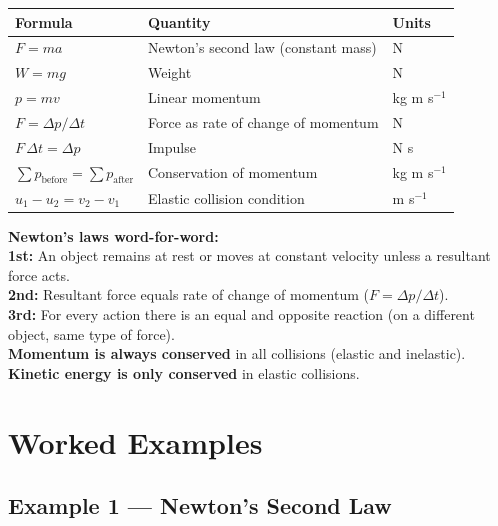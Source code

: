 \begin{minipage}{\linewidth}
\begin{tcolorbox}[colback=lightgold, colframe=accentgold]
\renewcommand{\arraystretch}{1.8}
\begin{tabular}{@{}lll@{}}
\toprule
\textbf{Formula} & \textbf{Quantity} & \textbf{Units} \\
\midrule
$F = ma$ & Newton's second law (constant mass) & N \\
$W = mg$ & Weight & N \\
$p = mv$ & Linear momentum & kg m s$^{-1}$ \\
$F = \Delta p / \Delta t$ & Force as rate of change of momentum & N \\
$F\,\Delta t = \Delta p$ & Impulse & N s \\
$\sum p_{\text{before}} = \sum p_{\text{after}}$ & Conservation of momentum & kg m s$^{-1}$ \\
$u_1 - u_2 = v_2 - v_1$ & Elastic collision condition & m s$^{-1}$ \\
\bottomrule
\end{tabular}
\end{tcolorbox}

\vspace{0.5em}
\begin{tcolorbox}[colback=lightblue, colframe=darkblue]
\textbf{Newton's laws word-for-word:}\\[0.3em]
\textbf{1st:} An object remains at rest or moves at constant velocity unless a resultant force acts.\\[0.2em]
\textbf{2nd:} Resultant force equals rate of change of momentum ($F = \Delta p / \Delta t$).\\[0.2em]
\textbf{3rd:} For every action there is an equal and opposite reaction (on a different object, same type of force).\\[0.3em]
\textbf{Momentum is always conserved} in all collisions (elastic and inelastic).\\
\textbf{Kinetic energy is only conserved} in elastic collisions.
\end{tcolorbox}
\end{minipage}

\pagebreak


\section{Worked Examples}

\subsection*{Example 1 --- Newton's Second Law}

